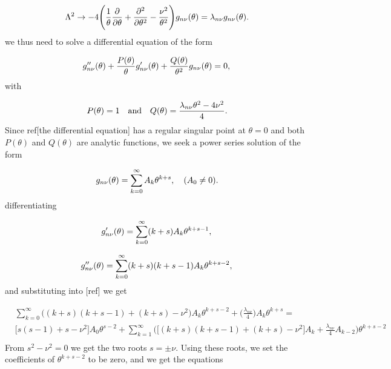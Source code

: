 \begin{equation}
\Lambda^{2} \rightarrow -4\Bigg(\frac{1}{\theta} \frac{\partial}{\partial \theta} + \frac{\partial^{2}}{\partial \theta^{2}} - \frac{\nu^{2}}{\theta^{2}}\Bigg) g_{n \nu}(\theta) = \lambda_{n \nu} g_{n \nu}(\theta).\\
\end{equation}
we thus need to solve a differential equation of the form

\begin{equation}
g_{n\nu}''(\theta) + \frac{P(\theta)}{\theta}g_{n\nu}'(\theta) + \frac{Q(\theta)}{\theta^{2}}g_{n\nu}(\theta) = 0,\\
\end{equation}
with

\begin{equation}
P(\theta)=1 \quad \text{and} \quad Q(\theta)= \frac{\lambda_{n \nu}\theta^{2} - 4\nu^{2}}{4}.\\
\end{equation}
Since ref[the differential equation] has a regular singular point at $\theta = 0$ and both $P(\theta)$ and $Q(\theta)$ are analytic functions, we seek a power series solution of the form

\begin{equation}
g_{n\nu}(\theta) = \sum_{k=0}^{\infty} A_{k} \theta^{k+s}, \quad (A_{0} \neq 0).\\
\end{equation}
differentiating

\begin{equation}
g'_{n\nu}(\theta) = \sum_{k=0}^{\infty} (k+s) A_{k} \theta^{k+s-1},\\
\end{equation}


\begin{equation}
g''_{n\nu}(\theta) = \sum_{k=0}^{\infty} (k+s)(k+s-1) A_{k} \theta^{k+s-2},\\
\end{equation}
and substituting into [ref] we get

\begin{align*}
&\sum_{k=0}^{\infty} \Bigg( (k+s)(k+s-1) + (k+s) - \nu^{2}\Bigg) A_{k} \theta^{k+s-2} + \Bigg(\frac{\lambda_{n\nu}}{4}  \Bigg) A_{k} \theta^{k+s} = \\
&\big[ s(s-1) + s -\nu^{2} \big] A_{0} \theta^{s-2} + \sum_{k=1}^{\infty} \Bigg( \big[ (k+s)(k+s-1) + (k+s) - \nu^{2}  \big] A_{k} + \frac{\lambda_{n\nu}}{4} A_{k-2}\Bigg) \theta^{k+s-2}\\
\end{align*}
From $s^{2} - \nu^{2} = 0$ we get the two roots $s = \pm \nu$. Using these roots, we set the coefficients of $\theta^{k+s-2}$ to be zero, and we get the equations


